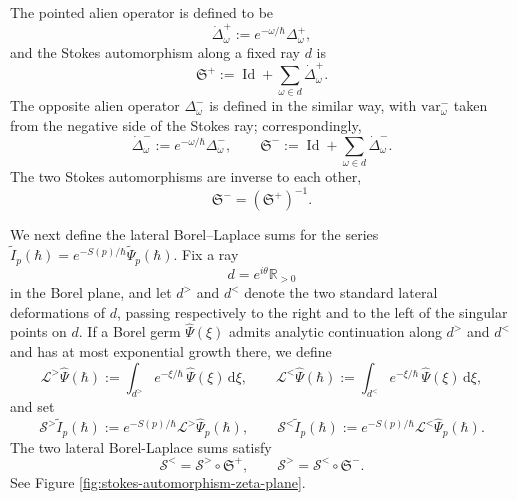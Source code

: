 \documentclass[11pt]{amsart}
\DeclareMathOperator{\Id}{Id}
\theoremstyle{plain}
\newcommand{\R}{\mathbb R}
\newcommand{\dd}{\mathrm d}
\begin{document}
The pointed alien operator is defined to be
\begin{equation*}
\dot\Delta_\omega^{+}:=e^{-\omega/\hbar}\Delta_\omega^{+},
\end{equation*}
and the Stokes automorphism along a fixed ray \(d\) is
\begin{equation}\label{eq:Stokesauto}
\mathfrak S^{+} :=\Id+\sum_{\omega\in d}\dot\Delta_\omega^{+}.
\end{equation}
The opposite alien operator \(\Delta_\omega^{-}\) is defined in the similar way, with \(\mathrm{var}_\omega^{-}\) taken from the negative side of the Stokes ray; correspondingly,
\begin{equation*}
\dot\Delta_\omega^{-}:=e^{-\omega/\hbar}\Delta_\omega^{-},
\qquad
\mathfrak S^{-}:=\Id+\sum_{\omega\in d}\dot\Delta_\omega^{-}.
\end{equation*}
The two Stokes automorphisms are inverse to each other,
\begin{equation*}
\mathfrak S^{-}=(\mathfrak S^{+})^{-1}.
\end{equation*}

We next define the lateral Borel--Laplace sums for the series $\widetilde I_p(\hbar)=e^{-S(p)/\hbar}\widetilde\Psi_p(\hbar)$. Fix a ray
\begin{equation*}
d=e^{i\theta}\R_{>0}
\end{equation*}
in the Borel plane, and let \(d^{>}\) and \(d^{<}\) denote the two standard lateral deformations of \(d\), passing respectively to the right and to the left of the singular points on \(d\).  
If a Borel germ \(\widehat\Psi(\xi)\) admits analytic continuation along \(d^{>}\) and \(d^{<}\) and has at most exponential growth there, we define
\begin{equation*}
\mathcal L^{>} \widehat\Psi(\hbar):=\int_{d^{>}} e^{-\xi/\hbar}\,\widehat\Psi(\xi)\,\dd\xi,
\qquad
\mathcal L^{<} \widehat\Psi(\hbar):=\int_{d^{<}} e^{-\xi/\hbar}\,\widehat\Psi(\xi)\,\dd\xi,
\end{equation*}
and set
\begin{equation*}
\mathcal S^{>} \widetilde I_p(\hbar):=e^{-S(p)/\hbar}\mathcal L^{>} \widehat\Psi_p(\hbar),
\qquad
\mathcal S^{<} \widetilde I_p(\hbar):=e^{-S(p)/\hbar}\mathcal L^{<} \widehat\Psi_p(\hbar).
\end{equation*}
The two lateral Borel-Laplace sums satisfy
\begin{equation}\label{Stokesauto}
\mathcal S^{<}=\mathcal S^{>}\circ \mathfrak S^{+},
\qquad
\mathcal S^{>}=\mathcal S^{<}\circ \mathfrak S^{-}.
\end{equation}
See Figure \ref{fig:stokes-automorphism-zeta-plane}.
\end{document}
